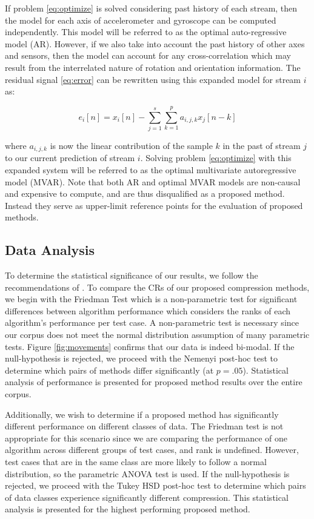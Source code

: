\documentclass[journal]{IEEEtran}
\begin{document}
If problem \eqref{eq:optimize} is solved considering past history of each stream, then the model for each axis of accelerometer and gyroscope can be computed independently. This model will be referred to as the optimal auto-regressive model (AR). However, if we also take into account the past history of other axes and sensors, then the model can account for any cross-correlation which may result from the interrelated nature of rotation and orientation information. The residual signal \eqref{eq:error} can be rewritten using this expanded model for stream $i$ as:

\begin{equation*}
e_i[n] = x_i[n] - \sum_{j=1}^{s}\sum_{k=1}^{p}a_{i,j,k}x_j[n-k]
\end{equation*}

where $a_{i,j,k}$ is now the linear contribution of the sample $k$ in the past of stream $j$ to our current prediction of stream $i$. Solving problem \eqref{eq:optimize} with this expanded system will be referred to as the optimal multivariate autoregressive model (MVAR). Note that both AR and optimal MVAR models are non-causal and expensive to compute, and are thus disqualified as a proposed method. Instead they serve as upper-limit reference points for the evaluation of proposed methods.

\subsection{Data Analysis}

To determine the statistical significance of our results, we follow the recommendations of \cite{Demsar2006}. To compare the CRs of our proposed compression methods, we begin with the Friedman Test \cite{Friedman1937} which is a non-parametric test for significant differences between algorithm performance which considers the ranks of each algorithm's performance per test case. A non-parametric test is necessary since our corpus does not meet the normal distribution assumption of many parametric tests. Figure \ref{fig:movements} confirms that our data is indeed bi-modal. If the null-hypothesis is rejected, we proceed with the Nemenyi post-hoc test \cite{Nemenyi1963} to determine which pairs of methods differ significantly (at $p=.05$). Statistical analysis of performance is presented for proposed method results over the entire corpus.

Additionally, we wish to determine if a proposed method has significantly different performance on different classes of data. The Friedman test is not appropriate for this scenario since we are comparing the performance of one algorithm across different groups of test cases, and rank is undefined. However, test cases that are in the same class are more likely to follow a normal distribution, so the parametric ANOVA test is used\cite{Fisher1959}. If the null-hypothesis is rejected, we proceed with the Tukey HSD post-hoc test \cite{Tukey1949} to determine which pairs of data classes experience significantly different compression. This statistical analysis is presented for the highest performing proposed method.
\end{document}
